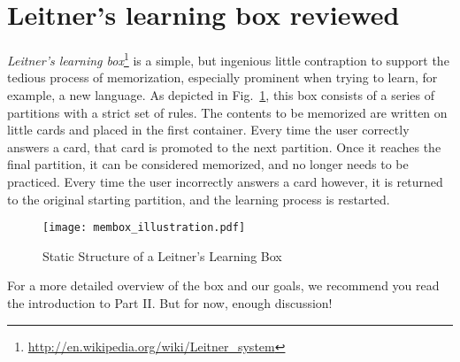 \section{Leitner's learning box reviewed}

\emph{Leitner's learning box}\footnote{\href{http://en.wikipedia.org/wiki/Leitner\_system}{http://en.wikipedia.org/wiki/Leitner\_system}} is a simple, but
ingenious little contraption to support the tedious process of memorization, especially prominent when trying to learn, for example, a new language. As depicted in
Fig.~\ref{fig:membox_depiction}, this box consists of a series of partitions with a strict set of rules. The contents to be memorized are written on little cards and placed in the first container. Every
time the user correctly answers a card, that card is promoted to the next partition. Once it reaches the final partition, it can be considered memorized, and
no longer needs to be practiced. Every time the user incorrectly answers a card however, it is returned to the original starting partition, and the
learning process is restarted.

\begin{figure}[htbp]
	\centering
  \texttt{[image: membox\_illustration.pdf]}
	\caption{Static Structure of a Leitner's Learning Box}
	\label{fig:membox_depiction}
\end{figure}

For a more detailed overview of the box and our goals, we recommend you read the introduction to Part II. But for now, enough discussion!

